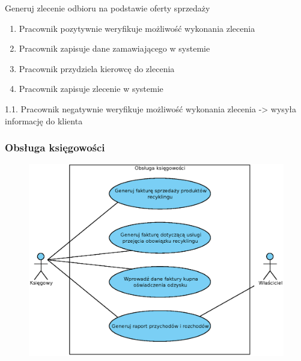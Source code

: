 	\begin{usecase}{Generuj zlecenie odbioru na podstawie oferty sprzedaży}
		\author{Beata Obrok} 
		\maketitle
\begin{scenario} 
			\begin{enumerate}
				\item Pracownik pozytywnie weryfikuje możliwość wykonania zlecenia
				\item Pracownik zapisuje dane zamawiającego w systemie
				\item Pracownik przydziela kierowcę do zlecenia
				\item Pracownik zapisuje zlecenie w systemie
			\end{enumerate}
		\end{scenario}
\begin{extensions}
				1.1. Pracownik negatywnie weryfikuje możliwość wykonania zlecenia -> wysyła informację do klienta
	\end{extensions}
\end{usecase}


\subsubsection{Obsługa księgowości}
	\begin{figure}[H]
		\centering
		\includegraphics[width=\textwidth]{img/UC/ksiegowosc.eps}
	\end{figure}

